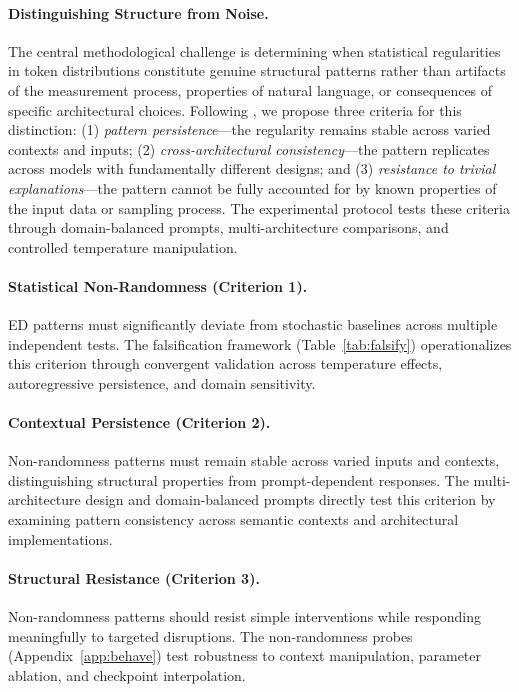 \documentclass[12pt]{article}
\begin{document}
\paragraph{Distinguishing Structure from Noise.}
The central methodological challenge is determining when statistical regularities in token distributions constitute genuine structural patterns rather than artifacts of the measurement process, properties of natural language, or consequences of specific architectural choices. Following \citet{neumann2022predictive}, we propose three criteria for this distinction: (1) \emph{pattern persistence}---the regularity remains stable across varied contexts and inputs; (2) \emph{cross-architectural consistency}---the pattern replicates across models with fundamentally different designs; and (3) \emph{resistance to trivial explanations}---the pattern cannot be fully accounted for by known properties of the input data or sampling process. The experimental protocol tests these criteria through domain-balanced prompts, multi-architecture comparisons, and controlled temperature manipulation.

\paragraph{Statistical Non-Randomness (Criterion 1).}
ED patterns must significantly deviate from stochastic baselines across multiple independent tests. The falsification framework (Table~\ref{tab:falsify}) operationalizes this criterion through convergent validation across temperature effects, autoregressive persistence, and domain sensitivity.

\paragraph{Contextual Persistence (Criterion 2).}
Non-randomness patterns must remain stable across varied inputs and contexts, distinguishing structural properties from prompt-dependent responses. The multi-architecture design and domain-balanced prompts directly test this criterion by examining pattern consistency across semantic contexts and architectural implementations.

\paragraph{Structural Resistance (Criterion 3).}
Non-randomness patterns should resist simple interventions while responding meaningfully to targeted disruptions. The non-randomness probes (Appendix~\ref{app:behave}) test robustness to context manipulation, parameter ablation, and checkpoint interpolation.
\end{document}
